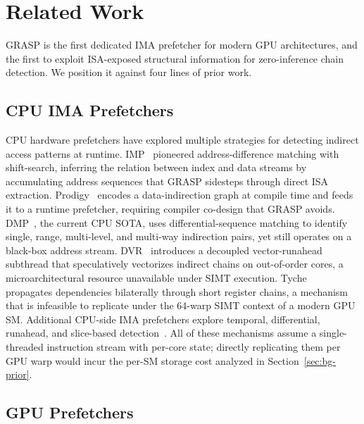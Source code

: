 \documentclass[sigconf, screen, review]{acmart}
\begin{document}
\section{Related Work}
\label{sec:related}

GRASP is the first dedicated IMA prefetcher for modern GPU
architectures, and the first to exploit ISA-exposed structural
information for zero-inference chain detection. We position it
against four lines of prior work.

\subsection{CPU IMA Prefetchers}
\label{sec:related-cpu}

CPU hardware prefetchers have explored multiple strategies for
detecting indirect access patterns at runtime.
IMP~\cite{yu2015imp} pioneered address-difference matching with
shift-search, inferring the relation between index and data streams
by accumulating address sequences that GRASP sidesteps through
direct ISA extraction.
Prodigy~\cite{talati2021prodigy} encodes a data-indirection graph at
compile time and feeds it to a runtime prefetcher, requiring
compiler co-design that GRASP avoids.
DMP~\cite{fu2024dmp}, the current CPU SOTA, uses differential-sequence
matching to identify single, range, multi-level, and multi-way
indirection pairs, yet still operates on a black-box address stream.
DVR~\cite{naithani2023dvr} introduces a decoupled vector-runahead
subthread that speculatively vectorizes indirect chains on
out-of-order cores, a microarchitectural resource unavailable under
SIMT execution.
Tyche~\cite{xue2024tyche} propagates dependencies bilaterally through
short register chains, a mechanism that is infeasible to replicate
under the 64-warp SIMT context of a modern GPU SM.
Additional CPU-side IMA prefetchers explore temporal, differential,
runahead, and slice-based
detection~\cite{cavus2020atp,kaushik2021gretch,ainsworth2018event,naithani2021vectorrunahead,naithani2020precise,litz2022crisp,bakhshalipour2018domino,fu2025magellan}.
All of these mechanisms assume a single-threaded instruction stream
with per-core state; directly replicating them per GPU warp would
incur the per-SM storage cost analyzed in
Section~\ref{sec:bg-prior}.

\subsection{GPU Prefetchers}
\label{sec:related-stride}
\end{document}
